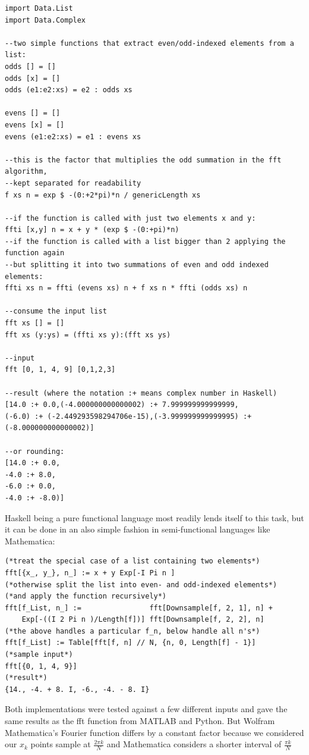 \documentclass[titlepage]{article}
\begin{document}
\begin{verbatim}
import Data.List
import Data.Complex

--two simple functions that extract even/odd-indexed elements from a list:
odds [] = []
odds [x] = []
odds (e1:e2:xs) = e2 : odds xs

evens [] = []
evens [x] = []
evens (e1:e2:xs) = e1 : evens xs

--this is the factor that multiplies the odd summation in the fft algorithm, 
--kept separated for readability
f xs n = exp $ -(0:+2*pi)*n / genericLength xs

--if the function is called with just two elements x and y:
ffti [x,y] n = x + y * (exp $ -(0:+pi)*n)
--if the function is called with a list bigger than 2 applying the function again 
--but splitting it into two summations of even and odd indexed elements:
ffti xs n = ffti (evens xs) n + f xs n * ffti (odds xs) n

--consume the input list 
fft xs [] = []
fft xs (y:ys) = (ffti xs y):(fft xs ys)

--input
fft [0, 1, 4, 9] [0,1,2,3]

--result (where the notation :+ means complex number in Haskell)
[14.0 :+ 0.0,(-4.000000000000002) :+ 7.999999999999999, 
(-6.0) :+ (-2.449293598294706e-15),(-3.999999999999995) :+ (-8.000000000000002)]

--or rounding:
[14.0 :+ 0.0,
-4.0 :+ 8.0, 
-6.0 :+ 0.0, 
-4.0 :+ -8.0)]
\end{verbatim}

Haskell being a pure functional language most readily lends itself to this task, but it can be done in an also simple fashion in semi-functional languages like Mathematica:

\begin{verbatim}
(*treat the special case of a list containing two elements*)
fft[{x_, y_}, n_] := x + y Exp[-I Pi n ]
(*otherwise split the list into even- and odd-indexed elements*)
(*and apply the function recursively*)
fft[f_List, n_] :=                fft[Downsample[f, 2, 1], n] + 
    Exp[-((I 2 Pi n )/Length[f])] fft[Downsample[f, 2, 2], n]
(*the above handles a particular f_n, below handle all n's*)
fft[f_List] := Table[fft[f, n] // N, {n, 0, Length[f] - 1}]
(*sample input*)
fft[{0, 1, 4, 9}]
(*result*)
{14., -4. + 8. I, -6., -4. - 8. I}
\end{verbatim}

Both implementations were tested against a few different inputs and gave the same results as the fft function from MATLAB and Python. But Wolfram Mathematica's Fourier function differs by a constant factor because we considered our $x_k$ points sample at $\frac{2\pi k}{N}$ and Mathematica considers a shorter interval of $\frac{\pi k}{N}$
\end{document}
